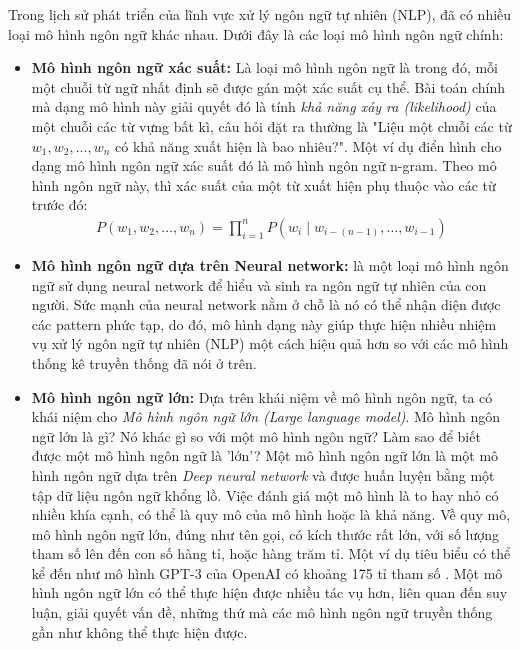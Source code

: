 \par Trong lịch sử phát triển của lĩnh vực xử lý ngôn ngữ tự nhiên (NLP), đã có nhiều loại mô hình ngôn ngữ khác nhau. Dưới đây là các loại mô hình ngôn ngữ chính:
\begin{itemize}
    \item \textbf{Mô hình ngôn ngữ xác suất:} Là loại mô hình ngôn ngữ là trong đó, mỗi một chuỗi từ ngữ nhất định sẽ được gán một xác suất cụ thể. Bài toán chính mà dạng mô hình này giải quyết đó là tính \emph{khả năng xảy ra (likelihood)} của một chuỗi các từ vựng bất kì, câu hỏi đặt ra thường là "Liệu một chuỗi các từ $w_1, w_2,..., w_n$ có khả năng xuất hiện là bao nhiêu?". Một ví dụ điển hình cho dạng mô hình ngôn ngữ xác suất đó là mô hình ngôn ngữ n-gram. Theo mô hình ngôn ngữ này, thì xác suất của một từ xuất hiện phụ thuộc vào các từ trước đó:
    \begin{align*}
       P(w_1, w_2, \ldots, w_n) = \prod_{i=1}^{n} P(w_i \mid w_{i-(n-1)}, \ldots, w_{i-1})     
    \end{align*}
    \item \textbf{Mô hình ngôn ngữ dựa trên Neural network: } là một loại mô hình ngôn ngữ sử dụng neural network để hiểu và sinh ra ngôn ngữ tự nhiên của con người. Sức mạnh của neural network nằm ở chỗ là nó có thể nhận diện được các pattern phức tạp, do đó, mô hình dạng này giúp thực hiện nhiều nhiệm vụ xử lý ngôn ngữ tự nhiên (NLP) một cách hiệu quả hơn so với các mô hình thống kê truyền thống đã nói ở trên.
    \item \textbf{Mô hình ngôn ngữ lớn:} Dựa trên khái niệm về mô hình ngôn ngữ, ta có khái niệm cho \emph{Mô hình ngôn ngữ lớn (Large language model)}. Mô hình ngôn ngữ lớn là gì? Nó khác gì so với một mô hình ngôn ngữ? Làm sao để biết được một mô hình ngôn ngữ là 'lớn'? Một mô hình ngôn ngữ lớn là một mô hình ngôn ngữ dựa trên \emph{Deep neural network} và được huấn luyện bằng một tập dữ liệu ngôn ngữ khổng lồ. Việc đánh giá một mô hình là to hay nhỏ có nhiều khía cạnh, có thể là quy mô của mô hình hoặc là khả năng. Về quy mô, mô hình ngôn ngữ lớn, đúng như tên gọi, có kích thước rất lớn, với số lượng tham số lên đến con số hàng tỉ, hoặc hàng trăm tỉ. Một ví dụ tiêu biểu có thể kể đến như mô hình GPT-3 của OpenAI có khoảng 175 tỉ tham số \cite{brown2020languagemodelsfewshotlearners}. Một mô hình ngôn ngữ lớn có thể thực hiện được nhiều tác vụ hơn, liên quan đến suy luận, giải quyết vấn đề, những thứ mà các mô hình ngôn ngữ truyền thống gần như không thể thực hiện được.
\end{itemize}
